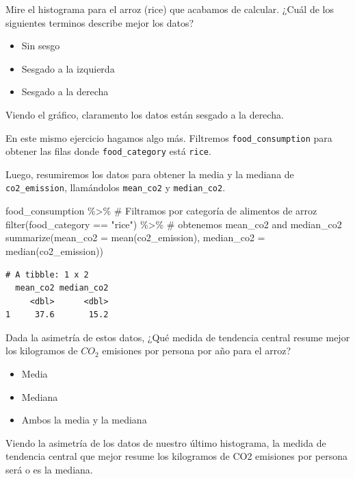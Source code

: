 \documentclass[
  letterpaper,
  DIV=11,
  numbers=noendperiod]{scrreprt}
\newenvironment{Shaded}{\begin{snugshade}}{\end{snugshade}}
\newcommand{\AttributeTok}[1]{\textcolor[rgb]{0.40,0.45,0.13}{#1}}
\newcommand{\CommentTok}[1]{\textcolor[rgb]{0.37,0.37,0.37}{#1}}
\newcommand{\FunctionTok}[1]{\textcolor[rgb]{0.28,0.35,0.67}{#1}}
\newcommand{\NormalTok}[1]{\textcolor[rgb]{0.00,0.23,0.31}{#1}}
\newcommand{\SpecialCharTok}[1]{\textcolor[rgb]{0.37,0.37,0.37}{#1}}
\newcommand{\StringTok}[1]{\textcolor[rgb]{0.13,0.47,0.30}{#1}}
\begin{document}
Mire el histograma para el arroz (rice) que acabamos de calcular. ¿Cuál
de los siguientes terminos describe mejor los datos?

\begin{itemize}
\item
  Sin sesgo
\item
  Sesgado a la izquierda
\item
  Sesgado a la derecha
\end{itemize}

Viendo el gráfico, claramento los datos están sesgado a la derecha.

En este mismo ejercicio hagamos algo más. Filtremos
\texttt{food\_consumption} para obtener las filas donde
\texttt{food\_category} está \texttt{rice}.

Luego, resumiremos los datos para obtener la media y la mediana de
\texttt{co2\_emission}, llamándolos \texttt{mean\_co2} y
\texttt{median\_co2}.

\begin{Shaded}
\begin{Highlighting}[]
\NormalTok{food\_consumption }\SpecialCharTok{\%\textgreater{}\%}
  \CommentTok{\# Filtramos por categoría de alimentos de arroz}
  \FunctionTok{filter}\NormalTok{(food\_category }\SpecialCharTok{==} \StringTok{"rice"}\NormalTok{) }\SpecialCharTok{\%\textgreater{}\%} 
  \CommentTok{\# obtenemos mean\_co2 and median\_co2}
  \FunctionTok{summarize}\NormalTok{(}\AttributeTok{mean\_co2 =} \FunctionTok{mean}\NormalTok{(co2\_emission),}
            \AttributeTok{median\_co2 =} \FunctionTok{median}\NormalTok{(co2\_emission))}
\end{Highlighting}
\end{Shaded}

\begin{verbatim}
# A tibble: 1 x 2
  mean_co2 median_co2
     <dbl>      <dbl>
1     37.6       15.2
\end{verbatim}

Dada la asimetría de estos datos, ¿Qué medida de tendencia central
resume mejor los kilogramos de \(CO_2\) emisiones por persona por año
para el arroz?

\begin{itemize}
\item
  Media
\item
  Mediana
\item
  Ambos la media y la mediana
\end{itemize}

Viendo la asimetría de los datos de nuestro último histograma, la medida
de tendencia central que mejor resume los kilogramos de CO2 emisiones
por persona será o es la mediana.
\end{document}

